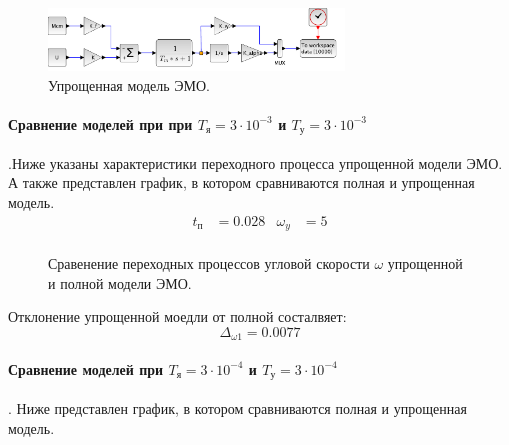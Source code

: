 \documentclass[a4paper, 11pt]{article}
\begin{document}
\begin{figure}[h!]
    \centering
    \includegraphics[width = 0.7\textwidth]{../images/EasyModel/easy-model.pdf}
    \caption{Упрощенная модель ЭМО.}
\end{figure}

\paragraph{Сравнение моделей при при $T_\text{я} = 3\cdot10^{-3}$ и $T_\text{у} = 3\cdot10^{-3}$}.Ниже указаны характеристики переходного процесса упрощенной модели ЭМО. А также представлен график, в котором сравниваются полная и упрощенная модель.
\begin{align*}
    t_\text{п} & = 0.028 & \omega_y & = 5 \\
\end{align*}

\begin{figure}[h!]
    \centering
    \caption{Сравенение переходных процессов угловой скорости $\omega$ упрощенной и полной модели ЭМО.}
\end{figure}

Отклонение упрощенной моедли от полной состалвяет:
\begin{equation}
    \Delta_{\omega1} = 0.0077
\end{equation}

\paragraph{Сравнение моделей при $T_\text{я} = 3\cdot10^{-4}$ и $T_\text{у} = 3\cdot10^{-4}$}. Ниже представлен график, в котором сравниваются полная и упрощенная модель.
\end{document}
